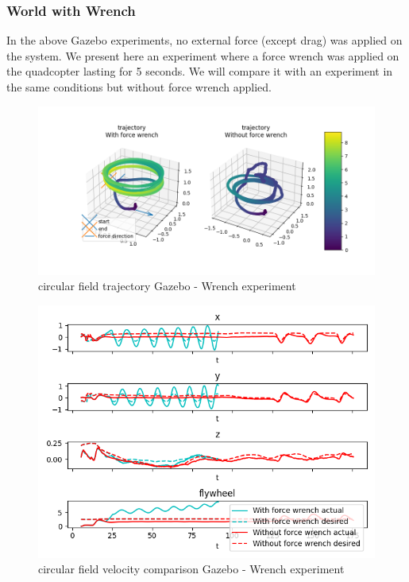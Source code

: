 \subsubsection{World with Wrench}
In the above Gazebo experiments, no external force (except drag) was applied on the system. 
We present here an experiment where a force wrench was applied on the quadcopter lasting for 5 seconds. 
We will compare it with an experiment in the same conditions but without force wrench applied.
\begin{figure}[h!]
   \centering
   \includegraphics[width=\linewidth]{Images/gazebo_trajectory_wrench_circular.png}
   \caption{circular field trajectory Gazebo - Wrench experiment}
   \label{fig:trajgazebocircularfwrench}
\end{figure}
\begin{figure}[h!]
   \centering
   \includegraphics[width=\linewidth]{Images/gazebo_circular_wrench_V.png}
   \caption{circular field velocity comparison Gazebo - Wrench experiment}
   \label{fig:velgazebocircularfwrench}
\end{figure}
